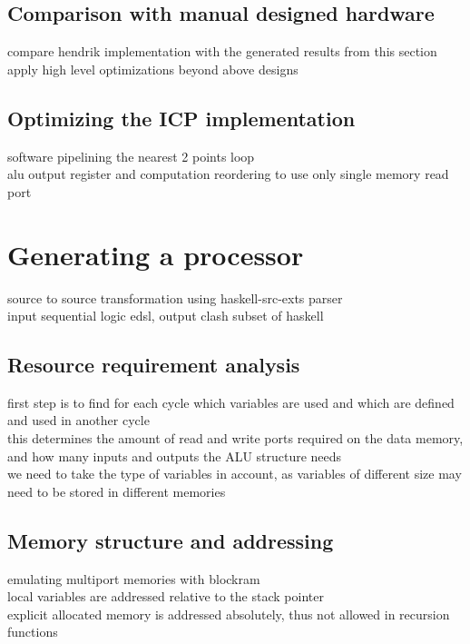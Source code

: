 \documentclass[preprint]{sigplanconf}
\def\codefamily{\sffamily\normalsize}
\begin{document}
\lstset{basicstyle=\codefamily}

\subsection{Comparison with manual designed hardware}
compare hendrik implementation with the generated results from this section \\
apply high level optimizations beyond above designs

\subsection{Optimizing the ICP implementation}
software pipelining the nearest 2 points loop \\
alu output register and computation reordering to use only single memory read port

\section{Generating a processor}
source to source transformation using haskell-src-exts parser\\
input sequential logic edsl, output clash subset of haskell

\subsection{Resource requirement analysis}

first step is to find for each cycle which variables are used and which are defined and used in another cycle \\
this determines the amount of read and write ports required on the data memory, and how many inputs and outputs the ALU structure needs \\
we need to take the type of variables in account, as variables of different size may need to be stored in different memories

\subsection{Memory structure and addressing}

emulating multiport memories with blockram \\
local variables are addressed relative to the stack pointer \\
explicit allocated memory is addressed absolutely, thus not allowed in recursion functions
\end{document}
